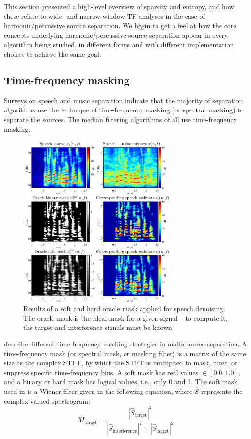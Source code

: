 \documentclass[letter,12pt]{article}
\begin{document}
This section presented a high-level overview of sparsity and entropy, and how these relate to wide- and narrow-window TF analyses in the case of harmonic/percussive source separation. We begin to get a feel at how the core concepts underlying harmonic/percussive source separation appear in every algorithm being studied, in different forms and with different implementation choices to achieve the same goal.

\vfill
\clearpage

\subsection{Time-frequency masking}

Surveys on speech \cite{speechmask} and music separation \cite{musicmask} indicate that the majority of separation algorithms use the technique of time-frequency masking (or spectral masking) to separate the sources. The median filtering algorithms of \citet{fitzgerald1, fitzgerald2, driedger} all use time-frequency masking.

\begin{figure}
	\vspace{-1.0em}
	\includegraphics[width=8cm]{./maskdemo.png}
	\caption{Results of a soft and hard oracle mask applied for speech denoising. The oracle mask is the ideal mask for a given signal -- to compute it, the target and interference signals must be known.}
	\label{fig:masks}
	\vspace{-1.5em}
\end{figure}

\citet{masking} describe different time-frequency masking strategies in audio source separation. A time-frequency mask (or spectral mask, or masking filter) is a matrix of the same size as the complex STFT, by which the STFT is multiplied to mask, filter, or suppress specific time-frequency bins. A soft mask has real values $\in [0.0, 1.0]$, and a binary or hard mask has logical values, i.e., only 0 and 1. The soft mask used in \cite{fitzgerald1, fitzgerald2} is a Wiener filter given in the following equation, where $\hat{S}$ represents the complex-valued spectrogram:
\[ M_{\text{target}} = \frac{|\hat{S}_{\text{target}}|^{2}}{|\hat{S}_{\text{interference}}|^{2} + |\hat{S}_{\text{target}}|^{2}} \]
\end{document}
